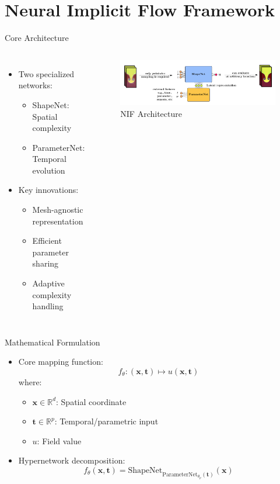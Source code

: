 \documentclass{beamer}
\begin{document}
\section{Neural Implicit Flow Framework}
\begin{frame}{Core Architecture}
    \begin{columns}
        \begin{itemize}
            \item Two specialized networks:
            \begin{itemize}
                \item ShapeNet: Spatial complexity
                \item ParameterNet: Temporal evolution
            \end{itemize}
            \item Key innovations:
            \begin{itemize}
                \item Mesh-agnostic representation
                \item Efficient parameter sharing
                \item Adaptive complexity handling
            \end{itemize}
        \end{itemize}
        
        \begin{figure}
            \includegraphics[width=\textwidth]{hypernetwork_diagram.png}
            \caption{NIF Architecture}
        \end{figure}
    \end{columns}
\end{frame}

\begin{frame}{Mathematical Formulation}
    \begin{itemize}
        \item Core mapping function:
        \[ f_\theta: (\mathbf{x}, \mathbf{t}) \mapsto u(\mathbf{x}, \mathbf{t}) \]
        where:
        \begin{itemize}
            \item $\mathbf{x} \in \mathbb{R}^d$: Spatial coordinate
            \item $\mathbf{t} \in \mathbb{R}^p$: Temporal/parametric input
            \item $u$: Field value
        \end{itemize}
        \item Hypernetwork decomposition:
        \[ f_\theta(\mathbf{x}, \mathbf{t}) = \text{ShapeNet}_{\text{ParameterNet}_{\theta_p}(\mathbf{t})}(\mathbf{x}) \]
    \end{itemize}
\end{frame}
\end{document}
